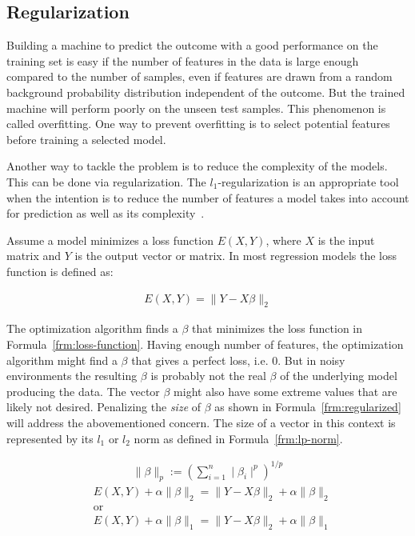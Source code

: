 \subsection{Regularization}
Building a machine to predict the outcome with a good performance on the training set is easy if the number of features in the data is large enough compared to the number of samples, even if features are drawn from a random background probability distribution independent of the outcome. But the trained machine will perform poorly on the unseen test samples. This phenomenon is called overfitting. One way to prevent overfitting is to select potential features before training a selected model.

Another way to tackle the problem is to reduce the complexity of the models. This can be done via regularization. The $l_1$-regularization is an appropriate tool when the intention is to reduce the number of features a model takes into account for prediction as well as its complexity~\cite{l1-regularized}.

Assume a model minimizes a loss function $E(X, Y)$, where $X$ is the input matrix and $Y$ is the output vector or matrix. In most regression models the loss function is defined as:

\begin{align}
  E(X, Y) = \parallel Y - X \beta \parallel_2
  \label{frm:loss-function}
\end{align}

The optimization algorithm finds a $\beta$ that minimizes the loss function in Formula~\ref{frm:loss-function}. Having enough number of features, the optimization algorithm might find a $\beta$ that gives a perfect loss, i.e. 0. But in noisy environments the resulting $\beta$ is probably not the real $\beta$ of the underlying model producing the data. The vector $\beta$ might also have some extreme values that are likely not desired. Penalizing the \emph{size} of $\beta$ as shown in Formula~\ref{frm:regularized} will address the abovementioned concern. The size of a vector in this context is represented by its $l_1$ or $l_2$ norm as defined in Formula~\ref{frm:lp-norm}.


\begin{align}
  \parallel \beta \parallel_p := \left(\sum\limits_{i=1}^n \mid \beta_i \mid^p \right)^{1/p}
  \label{frm:lp-norm}
\end{align}
\begin{align}
  &E(X, Y) + \alpha \parallel \beta \parallel_2 = \parallel Y - X \beta \parallel_2 + \alpha \parallel \beta \parallel_2 \nonumber \\
  &\text{or} \nonumber \\
  &E(X, Y) + \alpha \parallel \beta \parallel_1 = \parallel Y - X \beta \parallel_2 + \alpha \parallel \beta \parallel_1
  \label{frm:regularized}
\end{align}

